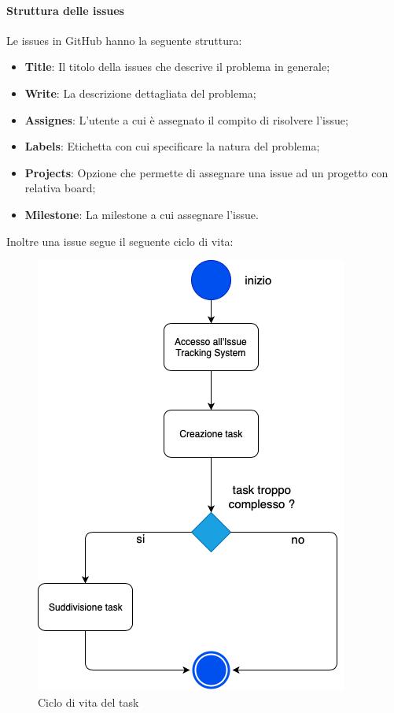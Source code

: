                     \clearpage
                    \paragraph{Struttura delle issues}
                        Le issues in GitHub hanno la seguente struttura:
                            \begin{itemize}
                                \item \textbf{Title}: Il titolo della issues che descrive il problema in generale;
                                \item \textbf{Write}: La descrizione dettagliata del problema;
                                \item \textbf{Assignes}: L'utente a cui è assegnato il compito di risolvere l'issue;
                                \item \textbf{Labels}: Etichetta con cui specificare la natura del problema;
                                \item \textbf{Projects}: Opzione che permette di assegnare una issue ad un progetto con relativa board;
                                \item \textbf{Milestone}: La milestone a cui assegnare l'issue. \newline
                            \end{itemize}
                            Inoltre una issue segue il seguente ciclo di vita:
                    	     \begin{figure}[!htbp]
                    	    	\centering
                    	    	\includegraphics[scale=0.5]{task.png}
                    	    	\caption{Ciclo di vita del task}
                    	    \end{figure}
                    	    \clearpage
